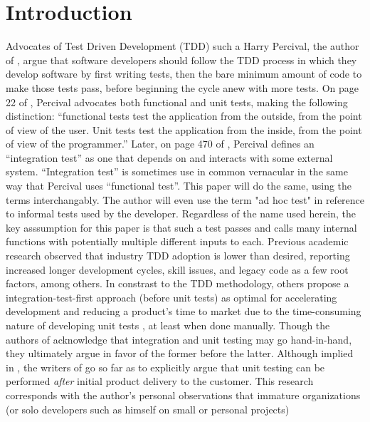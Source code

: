 \section{Introduction}\label{sec:introduction}
Advocates of Test Driven Development (TDD)  such a Harry Percival, the 
author of \cite{percival2014test}, argue that software developers should
 follow the TDD process in which they develop software by first writing tests,
then the bare minimum amount of code to make those tests pass,
before beginning the cycle anew with more tests.
%
On page 22 of \cite{percival2014test}, Percival advocates both functional and
 unit tests, making the following distinction:
“functional tests test the application from the outside, from the point of view
of the user. Unit tests test the application from the inside,
from the point of view of the programmer.”
%
Later, on page 470 of \cite{percival2014test}, Percival defines an “integration test” as
one that depends on and interacts with some external system.
%
“Integration test” is sometimes use in common vernacular in the same way that
Percival uses “functional test”.
%
This paper will do the same, using the terms interchangably.  The author will 
even use the term "ad hoc test" in reference to informal tests used by the developer.  
Regardless of the name used herein, the key asssumption for this paper is
 that such a test passes and calls many internal functions 
with potentially multiple different inputs to each.
%
Previous academic research \cite{causevic2011factors, ramzan2024test} observed
 that industry TDD adoption is lower than desired,
reporting increased longer development cycles, skill issues, and legacy code as 
a few root factors, among others.
%
In constrast to the TDD methodology, 
others \cite{brown2013agility, shahabuddin2016integration} propose a 
integration-test-first approach (before unit tests)
as optimal for accelerating development 
and reducing a product's time to market due to the time-consuming nature of 
developing unit tests \cite{kahur2023java, shahabuddin2016integration}, at least when done manually.
Though the authors of \cite{brown2013agility}
acknowledge that integration and unit testing may go hand-in-hand, they 
ultimately argue in favor of the former before the latter.  
Although implied in \cite{brown2013agility}, the writers of 
\cite{shahabuddin2016integration} go so far as to explicitly argue that unit
testing can be performed \textit{after} initial product delivery to the customer.
%
This research corresponds with the author’s personal observations that immature 
organizations (or solo developers such as himself on small or personal projects)
